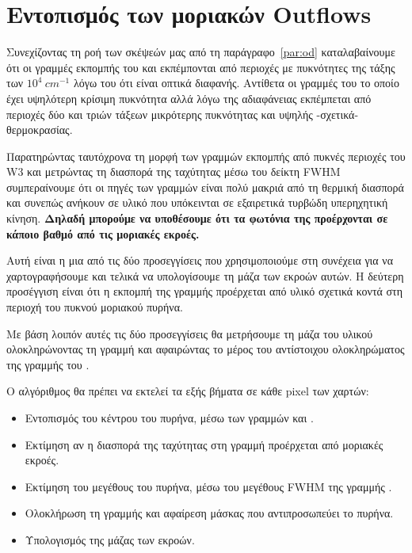 \documentclass[a4paper,12pt]{memoir}
\begin{document}
\section{Εντοπισμός των μοριακών Outflows}
\label{par:Outflow-Trace}
Συνεχίζοντας τη ροή των σκέψεών μας από τη παράγραφο~\ref{par:od} καταλαβαίνουμε ότι οι γραμμές εκπομπής του  και  εκπέμπονται από περιοχές με πυκνότητες της τάξης των $10^4\ cm^{-1}$ λόγω του ότι είναι οπτικά διαφανής.
Αντίθετα οι γραμμές του  το οποίο έχει υψηλότερη κρίσιμη πυκνότητα αλλά λόγω της αδιαφάνειας εκπέμπεται από περιοχές δύο και τριών τάξεων μικρότερης πυκνότητας και υψηλής -σχετικά- θερμοκρασίας.

Παρατηρώντας ταυτόχρονα τη μορφή των γραμμών εκπομπής από πυκνές περιοχές του W3 και μετρώντας τη διασπορά της ταχύτητας μέσω του δείκτη FWHM συμπεραίνουμε ότι οι πηγές των γραμμών  είναι πολύ μακριά από τη θερμική διασπορά και συνεπώς ανήκουν σε υλικό που υπόκεινται σε εξαιρετικά τυρβώδη υπερηχητική κίνηση. \textbf{Δηλαδή μπορούμε να υποθέσουμε ότι τα φωτόνια της  προέρχονται σε κάποιο βαθμό από τις μοριακές εκροές.}
 
Αυτή είναι η μια από τις δύο προσεγγίσεις που χρησιμοποιούμε στη συνέχεια για να χαρτογραφήσουμε και τελικά να υπολογίσουμε τη μάζα των εκροών αυτών. Η δεύτερη προσέγγιση είναι ότι η εκπομπή της γραμμής  προέρχεται από υλικό σχετικά κοντά στη περιοχή του πυκνού μοριακού πυρήνα. 

Με βάση λοιπόν αυτές τις δύο προσεγγίσεις θα μετρήσουμε τη μάζα του υλικού ολοκληρώνοντας τη γραμμή  και αφαιρώντας το μέρος του αντίστοιχου ολοκληρώματος της γραμμής του .

Ο αλγόριθμος θα πρέπει να εκτελεί τα εξής βήματα σε κάθε pixel των χαρτών:
\begin{itemize}
	\item Εντοπισμός του κέντρου του πυρήνα, μέσω των γραμμών  και .
	\item Εκτίμηση αν η διασπορά της ταχύτητας στη γραμμή  προέρχεται από μοριακές εκροές.
	\item Εκτίμηση του μεγέθους του πυρήνα, μέσω του μεγέθους FWHM της γραμμής .
	\item Ολοκλήρωση τη γραμμής  και αφαίρεση μάσκας που αντιπροσωπεύει το πυρήνα. 
	\item Υπολογισμός της μάζας των εκροών. 
\end{itemize}
\newpage
\end{document}
